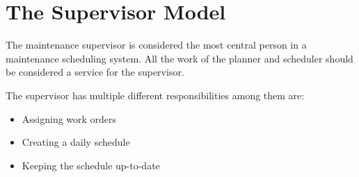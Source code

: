 \section{The Supervisor Model}
The maintenance supervisor is considered the most central person in a maintenance scheduling system. 
All the work of the planner and scheduler should be considered a service for the supervisor.

The supervisor has multiple different responsibilities among them are: 

\begin{itemize}
	\item Assigning work orders
	\item Creating a daily schedule
	\item Keeping the schedule up-to-date
\end{itemize}


